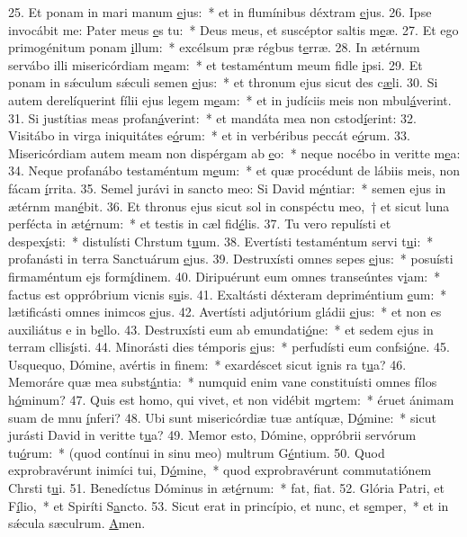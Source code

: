 25. Et ponam in mari manum \uline{e}jus:~* et in flumínibus déxtram \uline{e}jus.
26. Ipse invocábit me: Pater meus \uline{e}s tu:~* Deus meus, et suscéptor saltis m\uline{e}æ.
27. Et ego primogénitum ponam \uline{i}llum:~* excélsum præ régbus t\uline{e}rræ.
28. In ætérnum servábo illi misericórdiam m\uline{e}am:~* et testaméntum meum fidle \uline{i}psi.
29. Et ponam in sǽculum sǽculi semen \uline{e}jus:~* et thronum ejus sicut des c\uline{æ}li.
30. Si autem derelíquerint fílii ejus legem m\uline{e}am:~* et in judíciis meis non mbul\uline{á}verint.
31. Si justítias meas profan\uline{á}verint:~* et mandáta mea non cstod\uline{í}erint:
32. Visitábo in virga iniquitátes e\uline{ó}rum:~* et in verbéribus peccát e\uline{ó}rum.
33. Misericórdiam autem meam non dispérgam ab \uline{e}o:~* neque nocébo in veritte m\uline{e}a:
34. Neque profanábo testaméntum m\uline{e}um:~* et quæ procédunt de lábiis meis, non fácam \uline{í}rrita.
35. Semel jurávi in sancto meo: Si David m\uline{é}ntiar:~* semen ejus in ætérnm man\uline{é}bit.
36. Et thronus ejus sicut sol in conspéctu meo,~† et sicut luna perfécta in æt\uline{é}rnum:~* et testis in cæl fid\uline{é}lis.
37. Tu vero repulísti et despex\uline{í}sti:~* distulísti Chrstum t\uline{u}um.
38. Evertísti testaméntum servi t\uline{u}i:~* profanásti in terra Sanctuárum \uline{e}jus.
39. Destruxísti omnes sepes \uline{e}jus:~* posuísti firmaméntum ejs form\uline{í}dinem.
40. Diripuérunt eum omnes transeúntes v\uline{i}am:~* factus est oppróbrium vicnis s\uline{u}is.
41. Exaltásti déxteram depriméntium \uline{e}um:~* lætificásti omnes inimcos \uline{e}jus.
42. Avertísti adjutórium gládii \uline{e}jus:~* et non es auxiliátus e in b\uline{e}llo.
43. Destruxísti eum ab emundati\uline{ó}ne:~* et sedem ejus in terram cllis\uline{í}sti.
44. Minorásti dies témporis \uline{e}jus:~* perfudísti eum confsi\uline{ó}ne.
45. Usquequo, Dómine, avértis in f\uline{i}nem:~* exardéscet sicut ignis ra t\uline{u}a?
46. Memoráre quæ mea subst\uline{á}ntia:~* numquid enim vane constituísti omnes fílos h\uline{ó}minum?
47. Quis est homo, qui vivet, et non vidébit m\uline{o}rtem:~* éruet ánimam suam de mnu \uline{í}nferi?
48. Ubi sunt misericórdiæ tuæ antíquæ, D\uline{ó}mine:~* sicut jurásti David in veritte t\uline{u}a?
49. Memor esto, Dómine, oppróbrii servórum tu\uline{ó}rum:~* (quod contínui in sinu meo) multrum G\uline{é}ntium.
50. Quod exprobravérunt inimíci tui, D\uline{ó}mine,~* quod exprobravérunt commutatiónem Chrsti t\uline{u}i.
51. Benedíctus Dóminus in æt\uline{é}rnum:~* fat, f\uline{i}at.
52. Glória Patri, et F\uline{í}lio,~* et Spiríti S\uline{a}ncto.
53. Sicut erat in princípio, et nunc, et s\uline{e}mper,~* et in sǽcula sæculrum. \uline{A}men.
